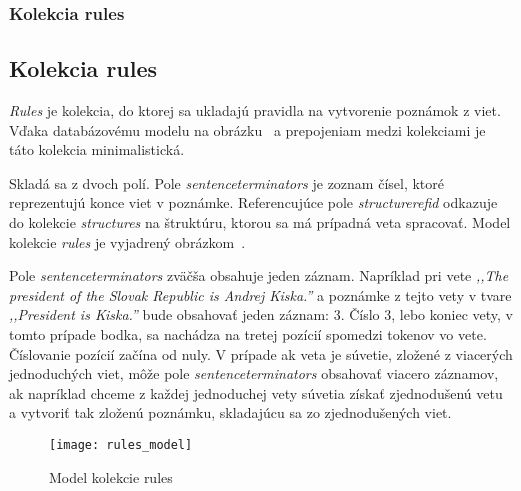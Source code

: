 %
%
{
	\subsubsection{Kolekcia rules}
}
{
	\subsection{Kolekcia rules}
}
\label{subsubsection:collection_rules}
\textit{Rules} je kolekcia, do ktorej sa ukladajú pravidla na vytvorenie poznámok z viet. Vďaka databázovému modelu na obrázku~ a prepojeniam medzi kolekciami je táto kolekcia minimalistická.

Skladá sa z dvoch polí. Pole \textit{sentence\textunderscore terminators} je zoznam čísel, ktoré reprezentujú konce viet v poznámke. Referencujúce pole \textit{structure\textunderscore ref\textunderscore id} odkazuje do kolekcie \textit{structures} na štruktúru, ktorou sa má prípadná veta spracovať. Model kolekcie \textit{rules} je vyjadrený obrázkom~.

Pole \textit{sentence\textunderscore terminators} zväčša obsahuje jeden záznam. Napríklad pri vete \textit{,,The president of the Slovak Republic is Andrej Kiska.''} a poznámke z tejto vety v tvare \textit{,,President is Kiska.''} bude obsahovať jeden záznam: 3. Číslo 3, lebo koniec vety, v tomto prípade bodka, sa nachádza na tretej pozícií spomedzi tokenov vo vete. Číslovanie pozícií začína od nuly. V prípade ak veta je súvetie, zložené z viacerých jednoduchých viet, môže pole \textit{sentence\textunderscore terminators} obsahovať viacero záznamov, ak napríklad chceme z každej jednoduchej vety súvetia získať zjednodušenú vetu a vytvoriť tak zloženú poznámku, skladajúcu sa zo zjednodušených viet.

\begin{figure}[H]
	\begin{center}\texttt{[image: rules\_model]}\end{center}
	\caption[Model kolekcie rules]{Model kolekcie rules}\label{fig:rules_collection_model}
\end{figure}

